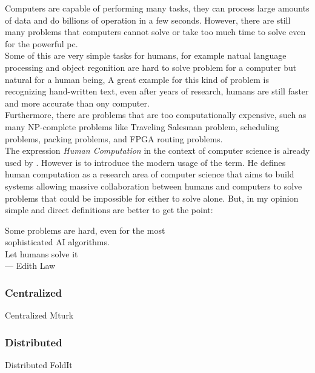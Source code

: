 
Computers are capable of performing many tasks, they can process large
amounts of data and do billions of operation in a few seconds.
However, there are still many problems that computers cannot solve
or take too much time to solve even for the powerful pc.\\

Some of this are very simple tasks for humans, for example natual language
processing and object regonition are hard to solve problem for a computer
but natural for a human being, A great example for this kind of problem
is recognizing hand-written text, even after years of research,
humans are still faster and more accurate than ony computer.\\

Furthermore, there are problems that are too computationally expensive,
such as many NP-complete problems like Traveling Salesman problem,
scheduling problems, packing problems, and FPGA routing problems.\\

The expression \emph{Human Computation} in the context of computer
science is already used by \cite{cogprints499}. However is \cite{human:comp}
to introduce the modern usage of the term. He defines human computation
as a research area of computer science that aims to build systems allowing
massive collaboration between humans and computers to solve problems that
could be impossible for either to solve alone. But, in my opinion simple
and direct definitions are better to get the point:
\begin{quoting}
	Some problems are hard, even for the most\\
	sophisticated AI algorithms.\\
	Let humans solve it\omissis\\
	\medskip
    {\rm --- Edith Law}
\end{quoting}

\subsubsection{Centralized}
Centralized Mturk

\subsubsection{Distributed}
Distributed FoldIt